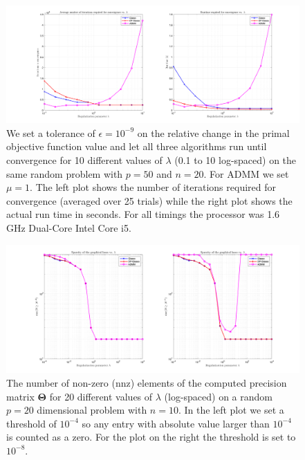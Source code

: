 \documentclass[10pt, letterpaper]{article}
\newcommand{\preci}{\boldsymbol \Theta}
\begin{document}
\begin{figure}
\centering
\includegraphics[width=\textwidth]{plots/runtimes.png}
\caption{We set a tolerance of $\epsilon = 10^{-9}$ on the relative change in the primal objective function value and let all three algorithms run until convergence for 10 different values of $\lambda$ (0.1 to 10 log-spaced) on the same random problem with $p=50$ and $n=20$.  For ADMM we set $\mu=1$.  The left plot shows the number of iterations required for convergence (averaged over 25 trials) while the right plot shows the actual run time in seconds.  For all timings the processor was 1.6 GHz Dual-Core Intel Core i5.}
\label{fig:runtimes}
\end{figure}


\begin{figure}
\centering
\includegraphics[width=\textwidth]{plots/sparsity_3methods.png}
\caption{The number of non-zero (nnz) elements of the computed precision matrix $\preci$ for 20 different values of $\lambda$ (log-spaced) on a random $p=20$ dimensional problem with $n=10$.  In the left plot we set a threshold of $10^{-4}$ so any entry with absolute value larger than $10^{-4}$ is counted as a zero.  For the plot on the right the threshold is set to $10^{-8}$.}
\label{fig:sparsity_3methods}
\end{figure}
\end{document}
